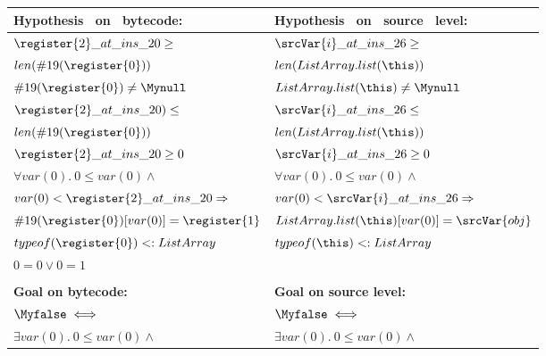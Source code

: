 \begin{center}

\begin{figure*}[!thb]

\begin{center}
\begin{tabular}{|l|l|}
\hline
\bf{Hypothesis \ on \ bytecode:}  & \bf{Hypothesis \ on \ source \ level:}  \\
\hline 
$\register{2}\_at\_ins\_20 \geq $ 
& $ \srcVar{i}\_at\_ins\_26 \geq$ \\

$len(\#19(\register{0})) $ & $  len(ListArray.list(\this)) $ \\
\hline 

$\#19(\register{0}) \neq \Mynull$ 
& $ ListArray.list(\this) \neq \Mynull$ \\

\hline 
$ \register{2}\_at\_ins\_20) \leq$ 
&  $  \srcVar{i}\_at\_ins\_26  \leq   $ \\
$ len(\#19(\register{0}))  $ & $ len(ListArray.list(\this))  $ \\
\hline

$\register{2}\_at\_ins\_20 \geq 0  $ 
& $ \srcVar{i}\_at\_ins\_26  \geq 0 $ \\

\hline

$\forall  var(0). \  0 \leq var(0) \wedge  $ & $\forall  var(0). \  0 \leq var(0) \wedge $ \\
$ var(0) < \register{2}\_at\_ins\_20 \Rightarrow $ & $  var(0) < \srcVar{i}\_at\_ins\_26 \Rightarrow $\\
$ \#19(\register{0})[var(0)] = \register{1}   $ & $  ListArray.list(\this)[var(0)] = \srcVar{obj}  $ \\

\hline

 $typeof(\register{0}) <: ListArray$ & $typeof( \this) <:  ListArray$  \\
\hline

$0=0 \vee 0=1$ & \\

& \\

\hline
\bf{Goal on bytecode:} & \bf{Goal on source level:} \\
\hline
$\Myfalse  \iff $ & $\Myfalse \iff  $ \\
 $ \exists  var(0) . \ 0 \leq var(0) \wedge$ 
& $ \exists  var(0) . \ 0 \leq var(0) \wedge$ \\


\end{tabular}
\end{center}
\end{figure*}
\end{center}
